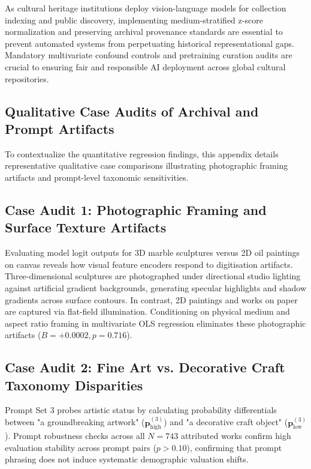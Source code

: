 \documentclass[pdflatex,sn-mathphys-num]{sn-jnl}%
\theoremstyle{thmstyleone}%
\theoremstyle{thmstyletwo}%
\theoremstyle{thmstylethree}%
\begin{document}
As cultural heritage institutions deploy vision-language models for collection indexing and public discovery, implementing medium-stratified z-score normalization and preserving archival provenance standards are essential to prevent automated systems from perpetuating historical representational gaps. Mandatory multivariate confound controls and pretraining curation audits are crucial to ensuring fair and responsible AI deployment across global cultural repositories.


\begin{appendices}
\section{Qualitative Case Audits of Archival and Prompt Artifacts}
\label{sec:appendix_cases}

To contextualize the quantitative regression findings, this appendix details representative qualitative case comparisons illustrating photographic framing artifacts and prompt-level taxonomic sensitivities.

\subsection{Case Audit 1: Photographic Framing and Surface Texture Artifacts}
Evaluating model logit outputs for 3D marble sculptures versus 2D oil paintings on canvas reveals how visual feature encoders respond to digitisation artifacts. Three-dimensional sculptures are photographed under directional studio lighting against artificial gradient backgrounds, generating specular highlights and shadow gradients across surface contours. In contrast, 2D paintings and works on paper are captured via flat-field illumination. Conditioning on physical medium and aspect ratio framing in multivariate OLS regression eliminates these photographic artifacts ($B = +0.0002, p = 0.716$).

\subsection{Case Audit 2: Fine Art vs. Decorative Craft Taxonomy Disparities}
Prompt Set 3 probes artistic status by calculating probability differentials between "a groundbreaking artwork" ($\mathbf{p}_{\text{high}}^{(3)}$) and "a decorative craft object" ($\mathbf{p}_{\text{low}}^{(3)}$). Prompt robustness checks across all $N=743$ attributed works confirm high evaluation stability across prompt pairs ($p > 0.10$), confirming that prompt phrasing does not induce systematic demographic valuation shifts.
\end{appendices}
\end{document}
